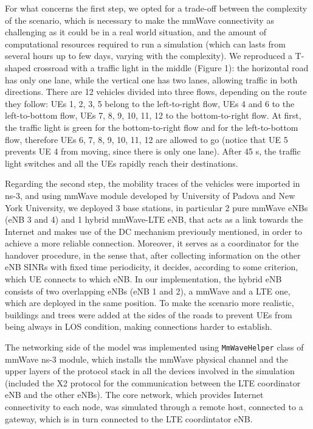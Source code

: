 \documentclass[conference,10pt]{IEEEtran}
\begin{document}
For what concerns the first step, we opted for a trade-off between the complexity of the scenario, which is necessary to make the mmWave connectivity as challenging as it could be in a real world situation, and the amount of computational resources required to run a simulation (which can lasts from several hours up to few days, varying with the complexity). We reproduced a T-shaped crossroad with a traffic light in the middle (Figure 1): the horizontal road has only one lane, while the vertical one has two lanes, allowing traffic in both directions. There are 12 vehicles divided into three flows, depending on the route they follow: UEs 1, 2, 3, 5 belong to the left-to-right flow, UEs 4 and 6 to the left-to-bottom flow, UEs 7, 8, 9, 10, 11, 12 to the bottom-to-right flow.
At first, the traffic light is green for the bottom-to-right flow and for the left-to-bottom flow, therefore UEs 6, 7, 8, 9, 10, 11, 12 are allowed to go (notice that UE 5 prevents UE 4 from moving, since there is only one lane). After 45 s, the traffic light switches and all the UEs rapidly reach their destinations.

Regarding the second step, the mobility traces of the vehicles were imported in ns-3, and using mmWave module developed by University of Padova and New York University, we deployed 3 base stations, in particular 2 pure mmWave eNBs (eNB 3 and 4) and 1 hybrid mmWave-LTE eNB, that acts as a link towards the Internet and makes use of the DC mechanism previously mentioned, in order to achieve a more reliable connection. Moreover, it serves as a coordinator for the handover procedure, in the sense that, after collecting information on the other eNB SINRs with fixed time periodicity, it decides, according to some criterion, which UE connects to which eNB. In our implementation, the hybrid eNB consists of two overlapping eNBs (eNB 1 and 2), a mmWave and a LTE one, which are deployed in the same position. To make the scenario more realistic, buildings and trees were added at the sides of the roads to prevent UEs from being always in LOS condition, making connections harder to establish.

The networking side of the model was implemented using \texttt{MmWaveHelper} class of mmWave ns-3 module, which installs the mmWave physical channel and the upper layers of the protocol stack in all the devices involved in the simulation (included the X2 protocol for the communication between the LTE coordinator eNB and the other eNBs). The core network, which provides Internet connectivity to each node, was simulated through a remote host, connected to a gateway, which is in turn connected to the LTE coordintator eNB.
\end{document}
